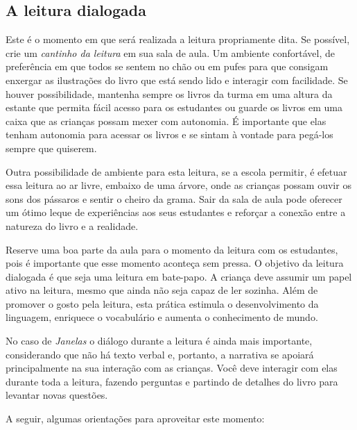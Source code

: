 \documentclass[11pt]{extarticle}
\begin{document}
\subsection{A leitura dialogada}
Este é o momento em que será realizada a leitura propriamente dita. 
Se possível, crie um \textit{cantinho da leitura} em sua sala de aula. Um 
ambiente confortável, de preferência em que todos se sentem no chão ou 
em pufes para que consigam enxergar as ilustrações do livro que está 
sendo lido e interagir com facilidade. Se houver possibilidade, mantenha 
sempre os livros da turma em uma altura da estante que permita fácil 
acesso para os estudantes ou guarde os livros em uma caixa que as crianças 
possam mexer com autonomia. É importante que elas tenham autonomia para 
acessar os livros e se sintam à vontade para pegá-los sempre que quiserem. 


Outra possibilidade de ambiente para esta leitura, se a escola permitir, 
é efetuar essa leitura ao ar livre, embaixo de uma árvore, onde as crianças 
possam ouvir os sons dos pássaros e sentir o cheiro da grama. Sair da sala 
de aula pode oferecer um ótimo leque de experiências aos seus estudantes e 
reforçar a conexão entre a natureza do livro e a realidade.  

Reserve uma boa parte da aula para o momento da leitura com os estudantes, 
pois é importante que esse momento aconteça sem pressa. O objetivo da 
leitura dialogada é que seja uma leitura em bate-papo. A criança deve 
assumir um papel ativo na leitura, mesmo que ainda não seja capaz de 
ler sozinha. Além de promover o gosto pela leitura, esta prática estimula 
o desenvolvimento da linguagem, enriquece o vocabulário e 
aumenta o conhecimento de mundo.

No caso de \textit{Janelas} o diálogo durante a leitura é 
ainda mais importante, considerando que não há texto verbal e, 
portanto, a narrativa se apoiará principalmente na sua interação com as crianças. 
Você deve interagir com elas durante toda a 
leitura, fazendo perguntas e partindo de detalhes do livro para 
levantar novas questões.

A seguir, algumas orientações para aproveitar este momento: 
\end{document}
